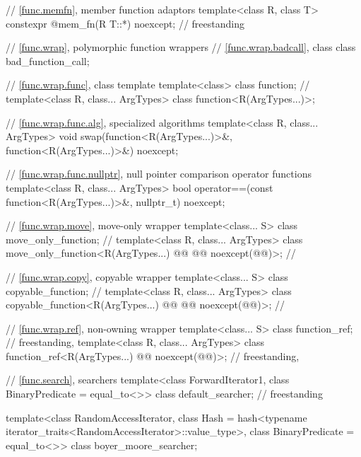 \begin{codeblock}
{  // \ref{func.memfn}, member function adaptors
  template<class R, class T>
    constexpr @\unspec@ mem_fn(R T::*) noexcept;                                  // freestanding

  // \ref{func.wrap}, polymorphic function wrappers
  // \ref{func.wrap.badcall}, class 
  class bad_function_call;

  // \ref{func.wrap.func}, class template 
  template<class> class function;       // \notdef
  template<class R, class... ArgTypes> class function<R(ArgTypes...)>;

  // \ref{func.wrap.func.alg},  specialized algorithms
  template<class R, class... ArgTypes>
    void swap(function<R(ArgTypes...)>&, function<R(ArgTypes...)>&) noexcept;

  // \ref{func.wrap.func.nullptr},  null pointer comparison operator functions
  template<class R, class... ArgTypes>
    bool operator==(const function<R(ArgTypes...)>&, nullptr_t) noexcept;

  // \ref{func.wrap.move}, move-only wrapper
  template<class... S> class move_only_function;                        // \notdef
  template<class R, class... ArgTypes>
    class move_only_function<R(ArgTypes...) @\cv{}\itcorr[-1]@ @@ noexcept(@@)>;     // \seebelow

  // \ref{func.wrap.copy}, copyable wrapper
  template<class... S> class copyable_function;                         // \notdef
  template<class R, class... ArgTypes>
    class copyable_function<R(ArgTypes...) @\cv{}\itcorr[-1]@ @@ noexcept(@@)>;      // \seebelow

  // \ref{func.wrap.ref}, non-owning wrapper
  template<class... S> class function_ref;                              // freestanding, \notdef
  template<class R, class... ArgTypes>
    class function_ref<R(ArgTypes...) @\cv{}\itcorr[-1]@ noexcept(@@)>;               // freestanding, \seebelow

  // \ref{func.search}, searchers
  template<class ForwardIterator1, class BinaryPredicate = equal_to<>>
    class default_searcher;                                                         // freestanding

  template<class RandomAccessIterator,
           class Hash = hash<typename iterator_traits<RandomAccessIterator>::value_type>,
           class BinaryPredicate = equal_to<>>
    class boyer_moore_searcher;

}
\end{codeblock}
